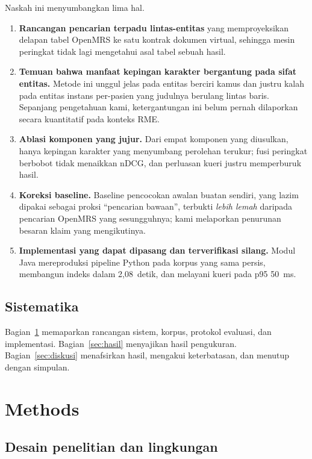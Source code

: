 \documentclass[journal,twoside,web]{ieeecolor}
\begin{document}
Naskah ini menyumbangkan lima hal.

\begin{enumerate}
\item \textbf{Rancangan pencarian terpadu lintas-entitas} yang memproyeksikan
delapan tabel OpenMRS ke satu kontrak dokumen virtual, sehingga mesin peringkat
tidak lagi mengetahui asal tabel sebuah hasil.
\item \textbf{Temuan bahwa manfaat kepingan karakter bergantung pada sifat
entitas.} Metode ini unggul jelas pada entitas berciri kamus dan justru kalah
pada entitas instans per-pasien yang judulnya berulang lintas baris. Sepanjang
pengetahuan kami, ketergantungan ini belum pernah dilaporkan secara kuantitatif
pada konteks RME.
\item \textbf{Ablasi komponen yang jujur.} Dari empat komponen yang diusulkan,
hanya kepingan karakter yang menyumbang perolehan terukur; fusi peringkat
berbobot tidak menaikkan nDCG, dan perluasan kueri justru memperburuk hasil.
\item \textbf{Koreksi baseline.} Baseline pencocokan awalan buatan sendiri, yang
lazim dipakai sebagai proksi ``pencarian bawaan'', terbukti \emph{lebih lemah}
daripada pencarian OpenMRS yang sesungguhnya; kami melaporkan penurunan besaran
klaim yang mengikutinya.
\item \textbf{Implementasi yang dapat dipasang dan terverifikasi silang.} Modul
Java mereproduksi pipeline Python pada korpus yang sama persis, membangun indeks
dalam 2,08~detik, dan melayani kueri pada p95 50~ms.
\end{enumerate}

\subsection{Sistematika}

Bagian~\ref{sec:metode} memaparkan rancangan sistem, korpus, protokol evaluasi,
dan implementasi. Bagian~\ref{sec:hasil} menyajikan hasil pengukuran.
Bagian~\ref{sec:diskusi} menafsirkan hasil, mengakui keterbatasan, dan menutup
dengan simpulan.

\section{Methods}
\label{sec:metode}

\subsection{Desain penelitian dan lingkungan}
\end{document}

